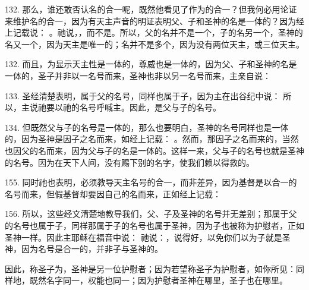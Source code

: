 132. 那么，谁还敢否认名的合一呢，既然他看见了作为的合一？但我何必用论证来维护名的合一，因为有天主声音的明证表明父、子和圣神的名是一体的？因为经上记载说： 。祂说，，而不是。所以，父的名并不是一个，子的名另一个，圣神的名又一个，因为天主是唯一的；名并不是多个，因为没有两位天主，或三位天主。\par

132. 而且，为显示天主性是一体的，尊威也是一体的，因为父、子和圣神的名是一体的，圣子并非以一名号而来，圣神也非以另一名号而来，主亲自说： \par

133. 圣经清楚表明，属于父的名号，同样也属于子，因为主在出谷纪中说：  所以，主说祂要以祂的名号呼喊主。因此，是父与子的名号。\par

134. 但既然父与子的名号是一体的，那么也要明白，圣神的名号同样也是一体的，因为圣神是因子之名而来，如经上记载： 。然而，那因子之名而来的，当然也因父的名而来，因为父与子的名是一体的。这样一来，父与子的名号也就是圣神的名号。因为在天下人间，没有赐下别的名字，使我们赖以得救的。\par

155. 同时祂也表明，必须教导天主名号的合一，而非差异，因为基督是以合一的名号而来，但假基督却要因自己的名而来，正如经上记载： \par

156. 所以，这些经文清楚地教导我们，父、子及圣神的名号并无差别；那属于父的名号也属于子，同样那属于子的名号也属于圣神，因为子也被称为护慰者，正如圣神一样。因此主耶稣在福音中说：  祂说：，说得好，以免你们以为子就是圣神，因为名号是合一的，并非子与圣神的。\par

因此，称圣子为，圣神是另一位护慰者；因为若望称圣子为护慰者，如你所见：同样地，既然名字同一，权能也同一；因为护慰者圣神在哪里，圣子也在哪里。\par

